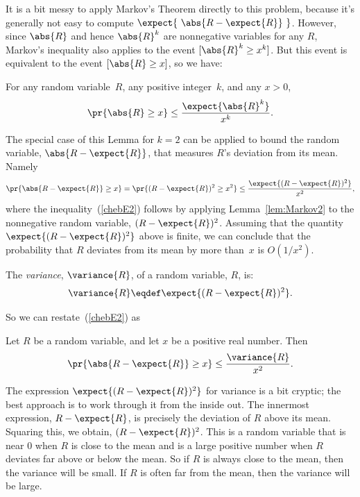 It is a bit messy to apply Markov's Theorem directly to this problem,
because it's generally not easy to compute $\expect{\ \abs{R -
\expect{R}}\ }$.  However, since $\abs{R}$ and hence $\abs{R}^k$ are
nonnegative variables for any $R$, Markov's inequality also applies to the
event $[\abs{R}^k \geq x^k]$.  But this event is equivalent to the event
$[\abs{R} \geq x]$, so we have:

\begin{lemma}\label{lem:Markov2}
For any random variable~$R$, any positive integer~$k$, and any $x > 0$,
\[
\pr{\abs{R} \geq x} \leq \frac{\expect{\abs{R}^k}}{x^k}.
\]
\end{lemma}

The special case of this Lemma for $k=2$ can be applied to bound the
random variable, $\abs{R - \expect{R}}$, that measures $R$'s deviation
from its mean.  Namely
\begin{equation}\label{chebE2}
\pr{\abs{R - \expect{R}} \geq x}
  = \pr{(R - \expect{R})^2 \geq x^2} \leq \frac{\expect{(R - \expect{R})^2}}{x^2},
\end{equation}
where the inequality~(\ref{chebE2}) follows by applying
Lemma~\ref{lem:Markov2} to the nonnegative random variable, $(R -
\expect{R})^2$.  Assuming that the quantity $\expect{(R - \expect{R})^2}$
above is finite, we can conclude that the probability that $R$ deviates
from its mean by more than~$x$ is $O(1/x^2)$.

\begin{definition}\label{defvar}
The \emph{variance}, $\variance{R}$, of a random variable, $R$, is:
\[
\variance{R} \eqdef \expect{(R - \expect{R})^2}.
\]
\end{definition}

So we can restate~(\ref{chebE2}) as
\begin{theorem}[Chebyshev]\label{chebthm}
Let $R$ be a random variable, and let $x$ be a positive real number.
Then
\[
\pr{\abs{R - \expect{R}} \geq x} \leq \frac{\variance{R}}{x^2}.
\]
\end{theorem}

The expression $\expect{(R - \expect{R})^2}$ for variance is a bit
cryptic; the best approach is to work through it from the inside out.  The
innermost expression, $R - \expect{R}$, is precisely the deviation of $R$
above its mean.  Squaring this, we obtain, $(R - \expect{R})^2$.  This is
a random variable that is near 0 when $R$ is close to the mean and is a
large positive number when $R$ deviates far above or below the mean.  So
if $R$ is always close to the mean, then the variance will be small.  If
$R$ is often far from the mean, then the variance will be large.

